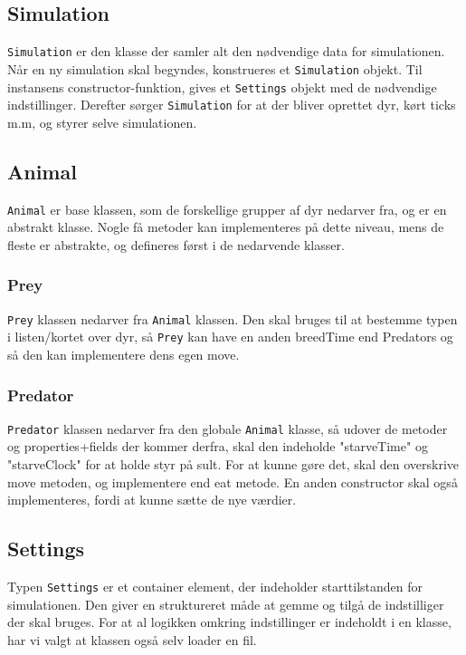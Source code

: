 \documentclass[a4paper]{article}
\begin{document}
    \subsection*{Simulation}
      \texttt{Simulation} er den klasse der samler alt den nødvendige data for simulationen.
      Når en ny simulation skal begyndes, konstrueres et \texttt{Simulation} objekt.
      Til instansens constructor-funktion, gives et \texttt{Settings} objekt med de nødvendige indstillinger.
      Derefter sørger \texttt{Simulation} for at der bliver oprettet dyr,
      kørt ticks m.m, og styrer selve simulationen.

    \subsection*{Animal}
      \texttt{Animal} er base klassen, som de forskellige grupper af dyr nedarver fra, og er en abstrakt klasse.
      Nogle få metoder kan implementeres på dette niveau, mens de fleste er abstrakte, og defineres først i de nedarvende klasser.

      \subsubsection*{Prey}
        \texttt{Prey} klassen nedarver fra \texttt{Animal} klassen.
        Den skal bruges til at bestemme typen i listen/kortet over dyr,
        så \texttt{Prey} kan have en anden breedTime end Predators og så den kan implementere dens egen move.

      \subsubsection*{Predator}
        \texttt{Predator} klassen nedarver fra den globale \texttt{Animal} klasse,
        så udover de metoder og properties+fields der kommer derfra, skal den indeholde "starveTime"
        og "starveClock" for at holde styr på sult. For at kunne gøre det, skal den overskrive move metoden,
        og implementere end eat metode. En anden constructor skal også implementeres, fordi at kunne sætte de nye værdier.

    \subsection*{Settings} \label{ssec:designSettings}
      Typen \texttt{Settings} er et container element, 
      der indeholder starttilstanden for simulationen.
      Den giver en struktureret måde at gemme og tilgå de indstilliger der skal bruges.
      For at al logikken omkring indstillinger er indeholdt i en klasse,
      har vi valgt at klassen også selv loader en fil.
\end{document}
